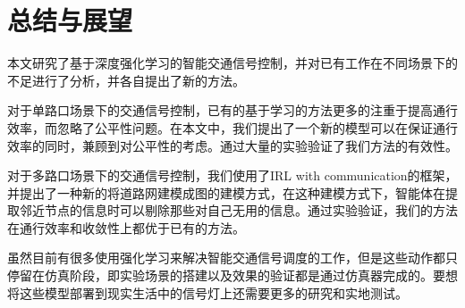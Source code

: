 \chapter{总结与展望}
本文研究了基于深度强化学习的智能交通信号控制，并对已有工作在不同场景下的不足进行了分析，并各自提出了新的方法。

对于单路口场景下的交通信号控制，已有的基于学习的方法更多的注重于提高通行效率，而忽略了公平性问题。在本文中，我们提出了一个新的模型可以在保证通行效率的同时，兼顾到对公平性的考虑。通过大量的实验验证了我们方法的有效性。

对于多路口场景下的交通信号控制，我们使用了IRL with communication的框架，并提出了一种新的将道路网建模成图的建模方式，在这种建模方式下，智能体在提取邻近节点的信息时可以剔除那些对自己无用的信息。通过实验验证，我们的方法在通行效率和收敛性上都优于已有的方法。

虽然目前有很多使用强化学习来解决智能交通信号调度的工作，但是这些动作都只停留在仿真阶段，即实验场景的搭建以及效果的验证都是通过仿真器完成的。要想将这些模型部署到现实生活中的信号灯上还需要更多的研究和实地测试。